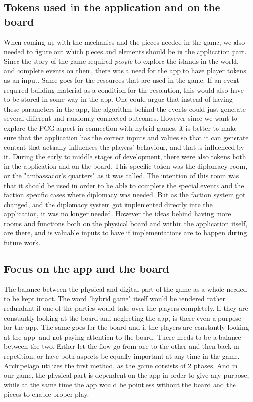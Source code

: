 \subsection{Tokens used in the application and on the board}
When coming up with the mechanics and the pieces needed in the game, we also needed to figure out which pieces and elements should be in the application part. Since the story of the game required \textit{people} to explore the islands in the world, and complete events on them, there was a need for the app to have player tokens as an input. Same goes for the resources that are used in the game. If an event required building material as a condition for the resolution, this would also have to be stored in some way in the app. One could argue that instead of having these parameters in the app, the algorithm behind the events could just generate several different and randomly connected outcomes. However since we want to explore the PCG aspect in connection with hybrid games, it is better to make sure that the application has the correct inputs and values so that it can generate content that actually influences the players' behaviour, and that is influenced by it.
During the early to middle stages of development, there were also tokens both in the application and on the board. This specific token was the diplomacy  room, or the "ambassador's quarters" as it was called. The intention of this room was that it should be used in order to be able to complete the special events and the faction specific cases where diplomacy was needed. But as the faction system got changed, and the diplomacy system got implemented directly into the application, it was no longer needed. However the ideas behind having more rooms and functions both on the physical board and within the application itself, are there, and is valuable inputs to have if implementations are to happen during future work.

\subsection{Focus on the app and the board}
The balance between the physical and digital part of the game as a whole needed to be kept intact. The word "hybrid game" itself would be rendered rather redundant if one of the parties would take over the players completely. If they are constantly looking at the board and neglecting the app, is there even a purpose for the app. The same goes for the board and if the players are constantly looking at the app, and not paying attention to the board. There needs to be a balance between the two. Either let the flow go from one to the other and then back in repetition, or have both aspects be equally important at any time in the game. Archipelago utilizes the first method, as the game consists of 2 phases. And in our game, the physical part is dependent on the app in order to give any purpose, while at the same time the app would be pointless without the board and the pieces to enable proper play.

